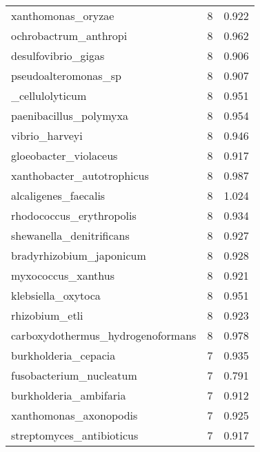 \begin{tabular}{lrr}
                          xanthomonas\_oryzae &                   8 &     0.922 \\
                       ochrobactrum\_anthropi &                   8 &     0.962 \\
                         desulfovibrio\_gigas &                   8 &     0.906 \\
                        pseudoalteromonas\_sp &                   8 &     0.907 \\
                [clostridium]\_cellulolyticum &                   8 &     0.951 \\
                      paenibacillus\_polymyxa &                   8 &     0.954 \\
                              vibrio\_harveyi &                   8 &     0.946 \\
                       gloeobacter\_violaceus &                   8 &     0.917 \\
                  xanthobacter\_autotrophicus &                   8 &     0.987 \\
                        alcaligenes\_faecalis &                   8 &     1.024 \\
                    rhodococcus\_erythropolis &                   8 &     0.934 \\
                    shewanella\_denitrificans &                   8 &     0.927 \\
                    bradyrhizobium\_japonicum &                   8 &     0.928 \\
                          myxococcus\_xanthus &                   8 &     0.921 \\
                          klebsiella\_oxytoca &                   8 &     0.951 \\
                              rhizobium\_etli &                   8 &     0.923 \\
           carboxydothermus\_hydrogenoformans &                   8 &     0.978 \\
                        burkholderia\_cepacia &                   7 &     0.935 \\
                     fusobacterium\_nucleatum &                   7 &     0.791 \\
                      burkholderia\_ambifaria &                   7 &     0.912 \\
                      xanthomonas\_axonopodis &                   7 &     0.925 \\
                   streptomyces\_antibioticus &                   7 &     0.917 \\

\end{tabular}

